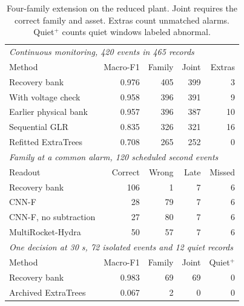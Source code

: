 \begin{table}[t]\centering\footnotesize
\caption{Four-family extension on the reduced plant. Joint requires the correct family and asset. Extras count unmatched alarms. Quiet$^+$ counts quiet windows labeled abnormal.}
\label{tab:four-family-comparison}\setlength{\tabcolsep}{2.6pt}
\begin{tabular*}{\columnwidth}{@{\extracolsep{\fill}}lrrrr@{}}\toprule
\multicolumn{5}{l}{\textit{Continuous monitoring, 420 events in 465 records}}\\
Method & Macro-F1 & Family & Joint & Extras \\
\midrule
Recovery bank & 0.976 & 405 & 399 & 3 \\
With voltage check & 0.958 & 396 & 391 & 9 \\
Earlier physical bank & 0.957 & 396 & 387 & 10 \\
Sequential GLR & 0.835 & 326 & 321 & 16 \\
Refitted ExtraTrees & 0.708 & 265 & 252 & 0 \\
\midrule
\multicolumn{5}{l}{\textit{Family at a common alarm, 120 scheduled second events}}\\
Readout & Correct & Wrong & Late & Missed \\
\midrule
Recovery bank & 106 & 1 & 7 & 6 \\
CNN-F & 28 & 79 & 7 & 6 \\
CNN-F, no subtraction & 27 & 80 & 7 & 6 \\
MultiRocket-Hydra & 50 & 57 & 7 & 6 \\
\midrule
\multicolumn{5}{l}{\textit{One decision at 30 s, 72 isolated events and 12 quiet records}}\\
Method & Macro-F1 & Family & Joint & Quiet$^+$ \\
\midrule
Recovery bank & 0.983 & 69 & 69 & 0 \\
Archived ExtraTrees & 0.067 & 2 & 0 & 0 \\
\bottomrule\end{tabular*}\end{table}

